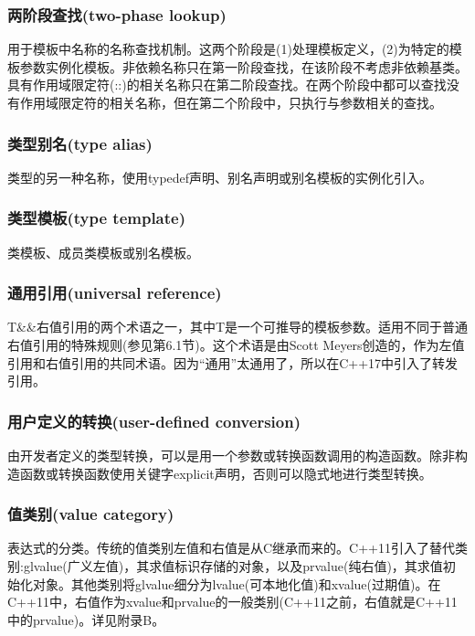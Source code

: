 \subsubsection{两阶段查找(two-phase lookup)}

用于模板中名称的名称查找机制。这两个阶段是(1)处理模板定义，(2)为特定的模板参数实例化模板。非依赖名称只在第一阶段查找，在该阶段不考虑非依赖基类。具有作用域限定符(::)的相关名称只在第二阶段查找。在两个阶段中都可以查找没有作用域限定符的相关名称，但在第二个阶段中，只执行与参数相关的查找。

\subsubsection{类型别名(type alias)}

类型的另一种名称，使用typedef声明、别名声明或别名模板的实例化引入。

\subsubsection{类型模板(type template)}

类模板、成员类模板或别名模板。

\subsubsection{通用引用(universal reference)}

T\&\&右值引用的两个术语之一，其中T是一个可推导的模板参数。适用不同于普通右值引用的特殊规则(参见第6.1节)。这个术语是由Scott Meyers创造的，作为左值引用和右值引用的共同术语。因为“通用”太通用了，所以在C++17中引入了转发引用。

\subsubsection{用户定义的转换(user-defined conversion)}

由开发者定义的类型转换，可以是用一个参数或转换函数调用的构造函数。除非构造函数或转换函数使用关键字explicit声明，否则可以隐式地进行类型转换。

\subsubsection{值类别(value category)}

表达式的分类。传统的值类别左值和右值是从C继承而来的。C++11引入了替代类别:glvalue(广义左值)，其求值标识存储的对象，以及prvalue(纯右值)，其求值初始化对象。其他类别将glvalue细分为lvalue(可本地化值)和xvalue(过期值)。在C++11中，右值作为xvalue和prvalue的一般类别(C++11之前，右值就是C++11中的prvalue)。详见附录B。

